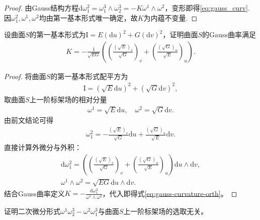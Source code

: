 \documentclass[../../main.tex]{subfiles}%
\begin{document}
\begin{proof}
由Gauss结构方程$\mathrm{d}\omega_1^2=\omega_1^3\land\omega_2^3=-K\omega^1\land\omega^2$，变形即得\eqref{eq:gauss_curv}.
因$\omega_1^2,\omega^1,\omega^2$均由第一基本形式唯一确定，故$K$为内蕴不变量.
\end{proof}

\begin{example}
设曲面$S$的第一基本形式为$\mathrm{I}=E(\mathrm{d}u)^2+G(\mathrm{d}v)^2$，证明曲面$S$的Gauss曲率满足
\begin{align}
K=-\frac{1}{\sqrt{EG}}\left(\left(\frac{(\sqrt{E})_v}{\sqrt{G}}\right)_v+\left(\frac{(\sqrt{G})_u}{\sqrt{E}}\right)_u\right).
\label{eq:gauss-curvature-orth}
\end{align}
\end{example}

\begin{proof}
将曲面$S$的第一基本形式配平方为
\begin{align*}
\mathrm{I}=(\sqrt{E}\mathrm{d}u)^2+(\sqrt{G}\mathrm{d}v)^2,
\end{align*}
取曲面$S$上一阶标架场的相对分量
\begin{align*}
\omega^1=\sqrt{E}\mathrm{d}u,\quad \omega^2=\sqrt{G}\mathrm{d}v.
\end{align*}
由前文结论可得
\begin{align*}
\omega_1^2=-\frac{(\sqrt{E})_v}{\sqrt{G}}\mathrm{d}u+\frac{(\sqrt{G})_u}{\sqrt{E}}\mathrm{d}v.
\end{align*}
直接计算外微分与外积：
\begin{align*}
\mathrm{d}\omega_1^2=\left(\left(\frac{(\sqrt{E})_v}{\sqrt{G}}\right)_v+\left(\frac{(\sqrt{G})_u}{\sqrt{E}}\right)_u\right)\mathrm{d}u\wedge\mathrm{d}v,\\
\omega^1\wedge\omega^2=\sqrt{EG}\mathrm{d}u\wedge\mathrm{d}v.
\end{align*}
结合Gauss曲率定义$K=-\frac{\mathrm{d}\omega_1^2}{\omega^1\wedge\omega^2}$，代入即得式\eqref{eq:gauss-curvature-orth}。
\end{proof}

\begin{example}
证明二次微分形式$\omega^1\omega_2^3-\omega^2\omega_1^3$与曲面$S$上一阶标架场的选取无关。
\end{example}
\end{document}
